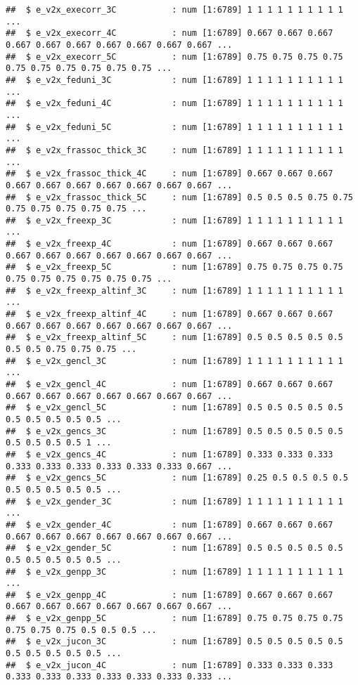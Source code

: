 \documentclass[
]{article}
\begin{document}
\begin{verbatim}
##  $ e_v2x_execorr_3C           : num [1:6789] 1 1 1 1 1 1 1 1 1 1 ...
##  $ e_v2x_execorr_4C           : num [1:6789] 0.667 0.667 0.667 0.667 0.667 0.667 0.667 0.667 0.667 0.667 ...
##  $ e_v2x_execorr_5C           : num [1:6789] 0.75 0.75 0.75 0.75 0.75 0.75 0.75 0.75 0.75 0.75 ...
##  $ e_v2x_feduni_3C            : num [1:6789] 1 1 1 1 1 1 1 1 1 1 ...
##  $ e_v2x_feduni_4C            : num [1:6789] 1 1 1 1 1 1 1 1 1 1 ...
##  $ e_v2x_feduni_5C            : num [1:6789] 1 1 1 1 1 1 1 1 1 1 ...
##  $ e_v2x_frassoc_thick_3C     : num [1:6789] 1 1 1 1 1 1 1 1 1 1 ...
##  $ e_v2x_frassoc_thick_4C     : num [1:6789] 0.667 0.667 0.667 0.667 0.667 0.667 0.667 0.667 0.667 0.667 ...
##  $ e_v2x_frassoc_thick_5C     : num [1:6789] 0.5 0.5 0.5 0.75 0.75 0.75 0.75 0.75 0.75 0.75 ...
##  $ e_v2x_freexp_3C            : num [1:6789] 1 1 1 1 1 1 1 1 1 1 ...
##  $ e_v2x_freexp_4C            : num [1:6789] 0.667 0.667 0.667 0.667 0.667 0.667 0.667 0.667 0.667 0.667 ...
##  $ e_v2x_freexp_5C            : num [1:6789] 0.75 0.75 0.75 0.75 0.75 0.75 0.75 0.75 0.75 0.75 ...
##  $ e_v2x_freexp_altinf_3C     : num [1:6789] 1 1 1 1 1 1 1 1 1 1 ...
##  $ e_v2x_freexp_altinf_4C     : num [1:6789] 0.667 0.667 0.667 0.667 0.667 0.667 0.667 0.667 0.667 0.667 ...
##  $ e_v2x_freexp_altinf_5C     : num [1:6789] 0.5 0.5 0.5 0.5 0.5 0.5 0.5 0.75 0.75 0.75 ...
##  $ e_v2x_gencl_3C             : num [1:6789] 1 1 1 1 1 1 1 1 1 1 ...
##  $ e_v2x_gencl_4C             : num [1:6789] 0.667 0.667 0.667 0.667 0.667 0.667 0.667 0.667 0.667 0.667 ...
##  $ e_v2x_gencl_5C             : num [1:6789] 0.5 0.5 0.5 0.5 0.5 0.5 0.5 0.5 0.5 0.5 ...
##  $ e_v2x_gencs_3C             : num [1:6789] 0.5 0.5 0.5 0.5 0.5 0.5 0.5 0.5 0.5 1 ...
##  $ e_v2x_gencs_4C             : num [1:6789] 0.333 0.333 0.333 0.333 0.333 0.333 0.333 0.333 0.333 0.667 ...
##  $ e_v2x_gencs_5C             : num [1:6789] 0.25 0.5 0.5 0.5 0.5 0.5 0.5 0.5 0.5 0.5 ...
##  $ e_v2x_gender_3C            : num [1:6789] 1 1 1 1 1 1 1 1 1 1 ...
##  $ e_v2x_gender_4C            : num [1:6789] 0.667 0.667 0.667 0.667 0.667 0.667 0.667 0.667 0.667 0.667 ...
##  $ e_v2x_gender_5C            : num [1:6789] 0.5 0.5 0.5 0.5 0.5 0.5 0.5 0.5 0.5 0.5 ...
##  $ e_v2x_genpp_3C             : num [1:6789] 1 1 1 1 1 1 1 1 1 1 ...
##  $ e_v2x_genpp_4C             : num [1:6789] 0.667 0.667 0.667 0.667 0.667 0.667 0.667 0.667 0.667 0.667 ...
##  $ e_v2x_genpp_5C             : num [1:6789] 0.75 0.75 0.75 0.75 0.75 0.75 0.75 0.5 0.5 0.5 ...
##  $ e_v2x_jucon_3C             : num [1:6789] 0.5 0.5 0.5 0.5 0.5 0.5 0.5 0.5 0.5 0.5 ...
##  $ e_v2x_jucon_4C             : num [1:6789] 0.333 0.333 0.333 0.333 0.333 0.333 0.333 0.333 0.333 0.333 ...

\end{verbatim}
\end{document}
